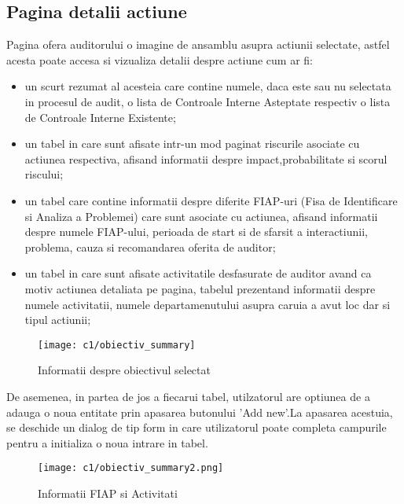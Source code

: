 \subsection{Pagina detalii actiune}
Pagina ofera auditorului o imagine de ansamblu asupra actiunii selectate, astfel acesta poate accesa si vizualiza detalii despre actiune cum ar fi:\\
\begin{itemize}
	\item un scurt rezumat al acesteia care contine numele, daca este sau nu selectata in procesul de audit, o lista de Controale Interne Asteptate respectiv o lista de Controale Interne Existente;
	
	\item  un tabel in care sunt afisate intr-un mod paginat riscurile asociate cu actiunea respectiva, afisand informatii despre impact,probabilitate si scorul riscului;
	
	\item  un tabel care contine informatii despre diferite FIAP-uri (Fisa de Identificare si Analiza a Problemei) care sunt asociate cu actiunea, afisand informatii despre numele FIAP-ului, perioada de start si de sfarsit a interactiunii, problema, cauza si recomandarea oferita de auditor;
	
	\item  un tabel  in care sunt afisate activitatile desfasurate de auditor avand ca motiv actiunea detaliata pe pagina, tabelul prezentand informatii despre numele activitatii, numele departamenutului asupra caruia a avut loc dar si tipul actiunii;
	
\end{itemize}


\vspace{1cm}
\begin{figure}[h]
	\centering
	
	\texttt{[image: c1/obiectiv\_summary]}
	\caption{Informatii despre obiectivul selectat}
\end{figure}


De asemenea, in partea de jos a fiecarui tabel, utilzatorul are optiunea de a adauga o noua entitate prin apasarea butonului 'Add new'.La apasarea acestuia, se deschide un dialog de tip 
form in care utilizatorul poate completa campurile pentru a initializa o noua intrare in tabel.

\vspace{1cm}
\begin{figure}[h]
	\centering
	
	\texttt{[image: c1/obiectiv\_summary2.png]}
	\caption{Informatii FIAP si Activitati}
\end{figure}


